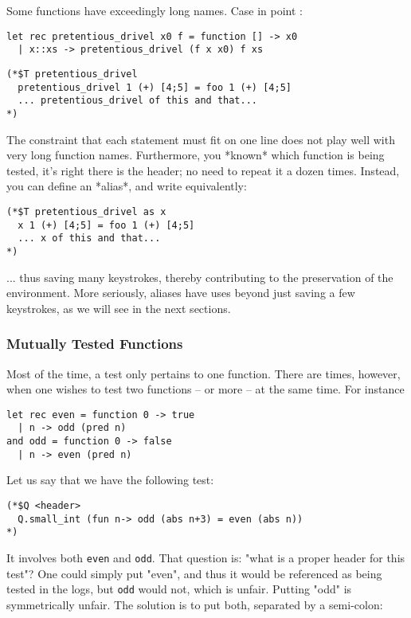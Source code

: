 \documentclass[a4paper,12pt]{article}
\begin{document}
Some functions have exceedingly long names. Case in point :

\begin{verbatim}
let rec pretentious_drivel x0 f = function [] -> x0
  | x::xs -> pretentious_drivel (f x x0) f xs
\end{verbatim} 
  
\begin{verbatim}
(*$T pretentious_drivel
  pretentious_drivel 1 (+) [4;5] = foo 1 (+) [4;5]
  ... pretentious_drivel of this and that...
*)
\end{verbatim}

The constraint that each statement must fit on one line does not play well with very long
function names. Furthermore, you *known* which function is being tested, it's right there
is the header; no need to repeat it a dozen times. Instead, you can define an *alias*, and
write equivalently:

\begin{verbatim}
(*$T pretentious_drivel as x
  x 1 (+) [4;5] = foo 1 (+) [4;5]
  ... x of this and that...
*)
\end{verbatim}

... thus saving many keystrokes, thereby contributing to the preservation of the
environment. More seriously, aliases have uses beyond just saving a few keystrokes, as we
will see in the next sections.
    
\subsubsection{Mutually Tested Functions}

Most of the time, a test only pertains to one function. There are times, however, when one
wishes to test two functions -- or more -- at the same time. For instance

\begin{verbatim}
let rec even = function 0 -> true
  | n -> odd (pred n)
and odd = function 0 -> false
  | n -> even (pred n)
\end{verbatim} 

Let us say that we have the following test:

\begin{verbatim}
(*$Q <header>
  Q.small_int (fun n-> odd (abs n+3) = even (abs n))
*)
\end{verbatim}

It involves both \texttt{even} and \texttt{odd}. That question is: "what is a proper header for this
test"? One could simply put "even", and thus it would be referenced as being tested in the
logs, but \texttt{odd} would not, which is unfair. Putting "odd" is symmetrically unfair. The
solution is to put both, separated by a semi-colon:
    
\end{document}
